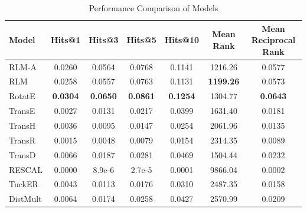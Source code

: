 

\begin{table}
\centering
\caption{Performance Comparison of Models}
\label{tab:models_performance_comparison}
\begin{tabular}{@{}lcccccc@{}}
\toprule
\textbf{Model} & \textbf{Hits@1} & \textbf{Hits@3} & \textbf{Hits@5} & \textbf{Hits@10} & \textbf{Mean Rank} & \textbf{Mean Reciprocal Rank} \\ 
\midrule
RLM-A          & 0.0260          & 0.0564          & 0.0768          & 0.1141           & 1216.26            & 0.0577                        \\
RLM            & 0.0258          & 0.0557          & 0.0763          & 0.1131           & \textbf{1199.26}   & 0.0573                        \\
RotatE          & \textbf{0.0304} & \textbf{0.0650} & \textbf{0.0861} & \textbf{0.1254}  & 1304.77            & \textbf{0.0643}               \\ 
TransE        & 0.0027          & 0.0131          & 0.0217          & 0.0399           & 1631.40            & 0.0181                        \\
TransH        & 0.0036          & 0.0095          & 0.0147          & 0.0254           & 2061.96            & 0.0135                        \\
TransR        & 0.0015          & 0.0048          & 0.0079          & 0.0154           & 2314.35            & 0.0089                        \\
TransD        & 0.0066          & 0.0187          & 0.0281          & 0.0469           & 1504.44            & 0.0232                        \\
RESCAL        & 0.0000          & 8.9e-6           & 2.7e-5          & 0.0001           & 9866.04            & 0.0002                        \\
TuckER        & 0.0043          & 0.0113          & 0.0176          & 0.0310           & 2487.35            & 0.0158                        \\
DistMult      & 0.0064          & 0.0174          & 0.0258          & 0.0427           & 2570.99            & 0.0209                        \\
\bottomrule
\end{tabular}
\end{table}


